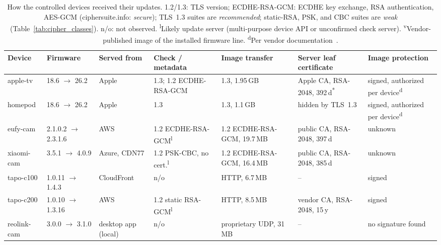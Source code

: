 \begin{table}[!t]
    \centering
    \color{blue}
    \caption{How the controlled devices received their updates. 1.2/1.3: TLS version; ECDHE-RSA-GCM: ECDHE key exchange, RSA authentication, AES-GCM (ciphersuite.info: \emph{secure}); TLS~1.3 suites are \emph{recommended}; static-RSA, PSK, and CBC suites are \emph{weak} (Table~\ref{tab:cipher_classes}). n/o: not observed. \textsuperscript{l}Likely update server (multi-purpose device API or unconfirmed check server). \textsuperscript{v}Vendor-published image of the installed firmware line. \textsuperscript{d}Per vendor documentation~\cite{apple-platform-security}.}
    \label{tab:profiles}
    \setlength{\tabcolsep}{2.4pt}
    \footnotesize
    \begin{tabular}{@{} l l l l l l >{\raggedright\arraybackslash}p{2.35cm} @{}}
        \toprule
        \textbf{Device} & \textbf{Firmware} & \textbf{Served from} & \textbf{Check / metadata} & \textbf{Image transfer} & \textbf{Server leaf certificate} & \textbf{Image protection} \\
        \midrule
        apple-tv    & 18.6 $\to$ 26.2       & Apple        & 1.3; 1.2 ECDHE-RSA-GCM                   & 1.3, 1.95\,GB & Apple CA, RSA-2048, 392\,d\textsuperscript{*} & signed, authorized per device\textsuperscript{d} \\
        homepod     & 18.6 $\to$ 26.2       & Apple        & 1.3                                      & 1.3, 1.1\,GB                & hidden by TLS~1.3                  & signed, authorized per device\textsuperscript{d} \\
        eufy-cam    & 2.1.0.2 $\to$ 2.3.1.6 & AWS          & 1.2 ECDHE-RSA-GCM\textsuperscript{l}     & 1.2 ECDHE-RSA-GCM, 19.7\,MB & public CA, RSA-2048, 397\,d        & unknown \\
        xiaomi-cam  & 3.5.1 $\to$ 4.0.9     & Azure, CDN77  & 1.2 PSK-CBC, no cert.\textsuperscript{l} & 1.2 ECDHE-RSA-GCM, 16.4\,MB & public CA, RSA-2048, 385\,d        & unknown \\
        tapo-c100   & 1.0.11 $\to$ 1.4.3    & CloudFront   & n/o                                      & HTTP, 6.7\,MB               & --                                 & signed \\
        tapo-c200   & 1.0.10 $\to$ 1.3.16   & AWS          & 1.2 static RSA-GCM\textsuperscript{l}    & HTTP, 8.5\,MB               & vendor CA, RSA-2048, 15\,y         & signed \\
        reolink-cam & 3.0.0 $\to$ 3.1.0     & desktop app (local) & n/o                                      & proprietary UDP, 31\,MB     & --                                 & no signature found \\

\end{tabular}
\end{table}
